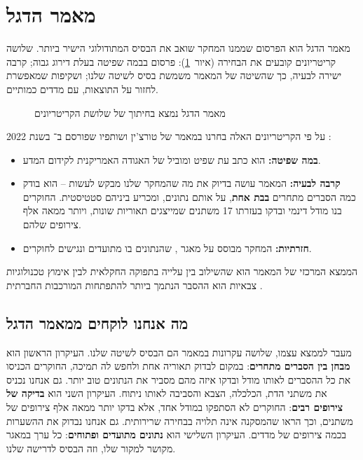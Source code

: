 \section{מאמר הדגל}
\label{sec:lit-flagship}

מאמר הדגל הוא הפרסום שממנו המחקר שואב את הבסיס המתודולוגי הישיר ביותר. שלושה קריטריונים קובעים את הבחירה (איור~\ref{fig:flagship}): פרסום בבמה שפיטה בעלת דירוג גבוה; קרבה ישירה לבעיה, כך שהשיטה של המאמר משמשת בסיס לשיטה שלנו; ושקיפות שמאפשרת לחזור על התוצאות, עם מדדים כמותיים.

\begin{figure}[htbp]
  \centering
  
  \caption{מאמר הדגל נמצא בחיתוך של שלושת הקריטריונים}
  \label{fig:flagship}
\end{figure}

על פי הקריטריונים האלה בחרנו במאמר של טורצ'ין ושותפיו שפורסם ב־ בשנת 2022 \cite{turchin2022disentangling}:

\begin{itemize}
  \item \textbf{במה שפיטה:}  הוא כתב עת שפיט ומוביל של האגודה האמריקנית לקידום המדע.
  \item \textbf{קרבה לבעיה:} המאמר עושה בדיוק את מה שהמחקר שלנו מבקש לעשות – הוא בודק כמה הסברים מתחרים \textbf{בבת אחת}, על אותם נתונים, ומכריע ביניהם סטטיסטית. החוקרים בנו מודל דינמי ובדקו בעזרתו 17 משתנים שמייצגים תאוריות שונות, ויותר ממאה אלף צירופים שלהם.
  \item \textbf{חזרתיות:} המחקר מבוסס על מאגר , שהנתונים בו מתועדים ונגישים לחוקרים.
\end{itemize}

הממצא המרכזי של המאמר הוא שהשילוב בין עלייה בתפוקה החקלאית לבין אימוץ טכנולוגיות צבאיות הוא ההסבר הנתמך ביותר להתפתחות המורכבות החברתית \cite{turchin2022disentangling}.

\subsection*{מה אנחנו לוקחים ממאמר הדגל}

מעבר לממצא עצמו, שלושה עקרונות במאמר הם הבסיס לשיטה שלנו. העיקרון הראשון הוא \textbf{מבחן בין הסברים מתחרים}: במקום לבדוק תאוריה אחת ולחפש לה תמיכה, החוקרים הכניסו את כל ההסברים לאותו מודל ובדקו איזה מהם מסביר את הנתונים טוב יותר. גם אנחנו נכניס את משתני הדת, הכלכלה, הצבא והסביבה לאותו ניתוח. העיקרון השני הוא \textbf{בדיקה של צירופים רבים}: החוקרים לא הסתפקו במודל אחד, אלא בדקו יותר ממאה אלף צירופים של משתנים, וכך הראו שהמסקנה אינה תלויה בבחירה שרירותית. גם אנחנו נבדוק את ההשערות בכמה צירופים של מדדים. העיקרון השלישי הוא \textbf{נתונים מתועדים ופתוחים}: כל ערך במאגר מקושר למקור שלו, וזה הבסיס לדרישה  שלנו.

